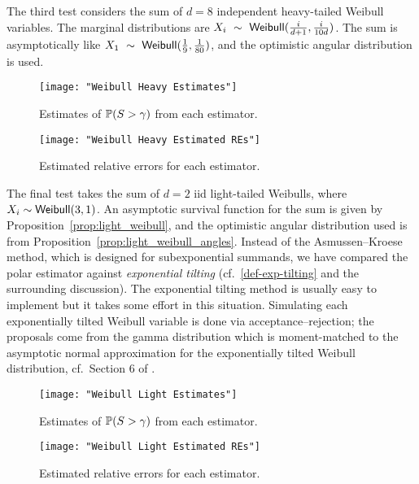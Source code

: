 The third test considers the sum of $d=8$ independent heavy-tailed Weibull variables. The marginal distributions are $X_i~\sim~\mathsf{Weibull}(\frac{i}{d+1}, \frac{i}{10d})$. The sum is asymptotically like $X_1~\sim~\mathsf{Weibull}(\frac{1}{9}, \frac{1}{80})$, and the optimistic angular distribution is used.
\begin{figure}[H]
	\centering
	\texttt{[image: "Weibull Heavy Estimates"]}
	\caption{Estimates of $\operatorname{{\mathbb P}}(S > \gamma)$ from each estimator.}
\end{figure}

\begin{figure}[H]
	\centering
	\texttt{[image: "Weibull Heavy Estimated REs"]}
	\caption{Estimated relative errors for each estimator.}
\end{figure}

The final test takes the sum of $d=2$ iid light-tailed Weibulls, where $X_i \sim \mathsf{Weibull}(3, 1)$. An asymptotic survival function for the sum is given by Proposition~\ref{prop:light_weibull}, and the optimistic angular distribution used is from Proposition~\ref{prop:light_weibull_angles}. Instead of the Asmussen--Kroese method, which is designed for subexponential summands, we have compared the polar estimator against \emph{exponential tilting} (cf.\ \eqref{def-exp-tilting} and the surrounding discussion). The exponential tilting method is usually easy to implement but it takes some effort in this situation. Simulating each exponentially tilted Weibull variable is done via acceptance--rejection; the proposals come from the gamma distribution which is moment-matched to the asymptotic normal approximation for the exponentially tilted Weibull distribution, cf.\ Section 6 of \cite{asmussen2017tail}.

\begin{figure}[H]
	\centering
	\texttt{[image: "Weibull Light Estimates"]}
	\caption{Estimates of $\operatorname{{\mathbb P}}(S > \gamma)$ from each estimator.}
\end{figure}

\begin{figure}[H]
	\centering
	\texttt{[image: "Weibull Light Estimated REs"]}
	\caption{Estimated relative errors for each estimator.}
\end{figure}




